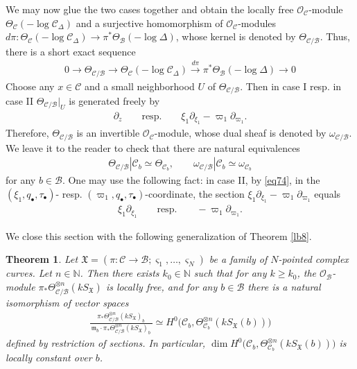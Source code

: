 \documentclass[12pt,a4paper,notitlepage]{report}
\theoremstyle{definition}
\theoremstyle{plain}
\newtheorem{thm}[df]{Theorem}
\newcommand{\fk}{\mathfrak}
\newcommand{\mc}{\mathcal}
\newcommand{\scr}{\mathscr}
\newcommand{\sgm}{\varsigma}
\newcommand{\SX}{S_{\fk X}}
\newcommand{\mbb}{\mathbb}
\newcommand{\blt}{\bullet}
\newcommand{\Nbb}{\mathbb N}
\numberwithin{equation}{section}
\begin{document}
We may now glue the two cases together and obtain the locally free $\scr O_{\mc C}$-module $\Theta_{\mc C}(-\log \mc C_\Delta)$  \index{zz@$\Theta_{\mc C}(-\log \mc C_\Delta)$} and a surjective  homomorphism of $\scr O_{\mc C}$-modules $d\pi:\Theta_{\mc C}(-\log \mc C_\Delta)\rightarrow\pi^*\Theta_{\mc B}(-\log\Delta)$, whose kernel is denoted by $\Theta_{\mc C/\mc B}$. \index{zz@$\Theta_{\mc C/\mc B}$} Thus, there is a short exact sequence
\begin{align}
\boxed{~~0\rightarrow \Theta_{\mc C/\mc B}\rightarrow \Theta_{\mc C}(-\log \mc C_\Delta)\xrightarrow{d\pi}\pi^*\Theta_{\mc B}(-\log \Delta)\rightarrow 0~~}\label{eq138}
\end{align}
Choose any $x\in\mc C$ and a small neighborhood $U$ of $\Theta_{\mc C/\mc B}$. Then in case I resp. in case II $\Theta_{\mc C/\mc B}|_U$ is generated freely by
\begin{align}
\partial_z\qquad\text{resp.}\qquad \xi_1\partial_{\xi_1}-\varpi_1\partial_{\varpi_1}.
\end{align}
Therefore, $\Theta_{\mc C/\mc B}$ is an invertible $\scr O_{\mc C}$-module, whose dual sheaf is denoted by $\omega_{\mc C/\mc B}$.\index{zz@$\omega_{\mc C/\mc B}$}    We leave it to the reader to check that there are natural equivalences
\begin{align*}
\Theta_{\mc C/\mc B}|\mc C_b\simeq \Theta_{\mc C_b},\qquad \omega_{\mc C/\mc B}|\mc C_b\simeq \omega_{\mc C_b}
\end{align*}
for any $b\in\mc B$. One may use the following fact:  in case II, by \eqref{eq74}, in the $(\xi_1,q_\blt,\tau_\blt)$- resp. $(\varpi_1,q_\blt,\tau_\blt)$-coordinate, the section $\xi_1\partial_{\xi_1}-\varpi_1\partial_{\varpi_1}$ equals
\begin{align}
\xi_1\partial_{\xi_1}\qquad\text{resp.}\qquad -\varpi_1\partial_{\varpi_1}.\label{eq80}
\end{align}

We close this section with the following generalization of Theorem \ref{lb8}.

\begin{thm}\label{lb9}
Let $\fk X=(\pi:\mc C\rightarrow\mc B;\sgm_1,\dots,\sgm_N)$ be a family of $N$-pointed complex curves. Let $n\in\Nbb$. Then  there exists $k_0\in\mbb N$ such that for any $k\geq k_0$,  the $\scr O_{\mc B}$-module  $\pi_*\Theta_{\mc C/\mc B}^{\otimes n}(k\SX)$ is locally free, and for any $b\in\mc B$ there is a natural isomorphism of vector spaces
\begin{align}
\frac{\pi_*\Theta_{\mc C/\mc B}^{\otimes n}(k\SX)_b}{~\fk m_b\cdot\pi_*\Theta_{\mc C/\mc B}^{\otimes n}(k\SX)_b~}\simeq H^0\big(\mc C_b,\Theta_{\mc C_b}^{\otimes n}(k\SX(b))\big)
\end{align} 
defined by  restriction of sections. In particular,  $\dim H^0\big(\mc C_b,\Theta_{\mc C_b}^{\otimes n}(k\SX(b))\big)$ is locally constant over $b$.
\end{thm}
\end{document}
